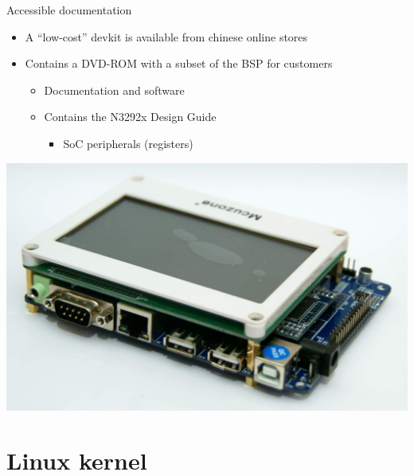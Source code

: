 \documentclass[xetex,table,aspectratio=169]{beamer}
\begin{document}
\begin{frame}{Accessible documentation}
  \begin{itemize}
  \item A ``low-cost'' devkit is available from chinese online stores
  \item Contains a DVD-ROM with a subset of the BSP for customers
    \begin{itemize}
    \item Documentation and software
    \item Contains the N3292x Design Guide
      \begin{itemize}
      \item SoC peripherals (registers)
      \end{itemize}
    \end{itemize}
  \end{itemize}
  \begin{center}
    \includegraphics[height=0.4\textheight]{images/devkit.jpg}
  \end{center}
\end{frame}

\section{Linux kernel}
\end{document}
